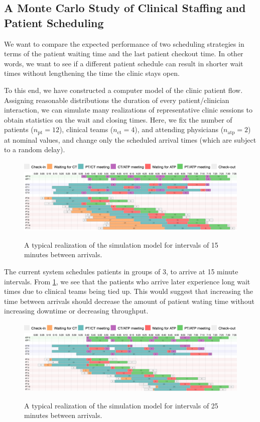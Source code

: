 \documentclass[11pt]{article}
\author{Author}
\date{\today}
\begin{document}
\subsection*{A Monte Carlo Study of Clinical Staffing and Patient Scheduling}

We want to compare the expected performance of two scheduling strategies in terms of the patient waiting time and the last patient checkout time. In other words, we want to see if a different patient schedule can result in shorter wait times without lengthening the time the clinic stays open.

To this end, we have constructed a computer model of the clinic patient flow. Assigning reasonable distributions the duration of every patient/clinician interaction, we can simulate many realizations of representative clinic sessions to obtain statistics on the wait and closing times. Here, we fix the number of patients ($n_\text{pt}=12$), clinical teams ($n_\text{ct}=4$), and attending physicians ($n_\text{atp}=2$) at nominal values, and change only the scheduled arrival times (which are subject to a random delay).
\begin{figure}[H]
  \includegraphics[width=0.75\linewidth]{legend.png}\\[0.5em]
  \includegraphics[width=\linewidth]{3_15.png}
  \caption{A typical realization of the simulation model for intervals of 15 minutes between arrivals.}
  \label{fig:gannt-15}
\end{figure}
The current system schedules patients in groups of 3, to arrive at 15 minute intervals. From \cref{fig:gannt-15}, we see that the patients who arrive later experience long wait times due to clinical teams being tied up. This would suggest that increasing the time between arrivals should decrease the amount of patient wating time without increasing downtime or decreasing throughput.
\begin{figure}[H]
  \includegraphics[width=0.75\linewidth]{legend.png}\\[0.5em]
  \includegraphics[width=\linewidth]{3_25.png}
  \caption{A typical realization of the simulation model for intervals of 25 minutes between arrivals.}
  \label{fig:gannt-25}
\end{figure}
\end{document}
